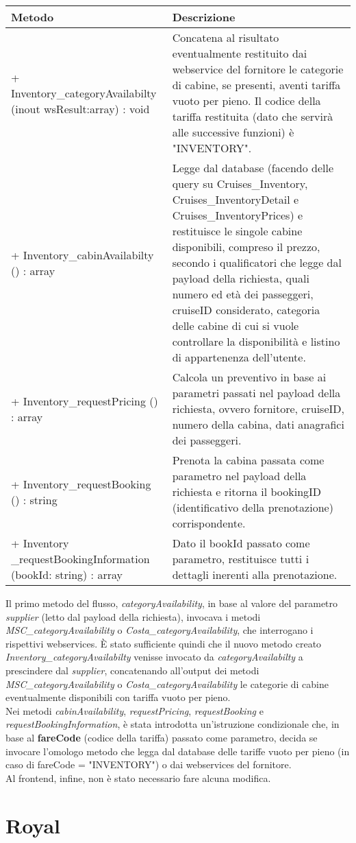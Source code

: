 \begin{center}
	\def\arraystretch{1.5}
	\begin{longtable}{ >{\raggedright}p{5.5cm} p{6.8cm}} 
		\hline
		\textbf{Metodo} & \textbf{Descrizione} \\ \hline
		+ Inventory\_categoryAvailabilty (inout wsResult:array) : void & Concatena al risultato eventualmente restituito dai \gls{webservice} del fornitore le categorie di cabine, se presenti, aventi tariffa vuoto per pieno. Il codice della tariffa restituita (dato che servirà alle successive funzioni) è "INVENTORY".\\
		\hline
		+ Inventory\_cabinAvailabilty () : array & Legge dal database (facendo delle query su Cruises\_Inventory, Cruises\_InventoryDetail e Cruises\_InventoryPrices) e restituisce le singole cabine disponibili, compreso il prezzo, secondo i qualificatori che legge dal payload della richiesta, quali numero ed età dei passeggeri, cruiseID considerato, categoria delle cabine di cui si vuole controllare la disponibilità e listino di appartenenza dell'utente.\\
		\hline
		+ Inventory\_requestPricing () : array & Calcola un preventivo in base ai parametri passati nel payload della richiesta, ovvero fornitore, cruiseID, numero della cabina, dati anagrafici dei passeggeri.\\
		\hline
		+ Inventory\_requestBooking () : string & Prenota la cabina passata come parametro nel payload della richiesta e ritorna il bookingID (identificativo della prenotazione) corrispondente.\\
		\hline
		+ Inventory \_requestBookingInformation (bookId: string) : array & Dato il bookId passato come parametro, restituisce tutti i dettagli inerenti alla prenotazione. \\
		\hline
	\end{longtable}
\end{center}
Il primo metodo del flusso, \textit{categoryAvailability}, in base al valore del parametro \textit{supplier} (letto dal payload della richiesta), invocava i metodi \textit{MSC\_categoryAvailability} o \textit{Costa\_categoryAvailability}, che interrogano i rispettivi \glspl{webservice}. È stato sufficiente quindi che il nuovo metodo creato \textit{Inventory\_categoryAvailabilty} venisse invocato da \textit{categoryAvailabilty} a prescindere dal \textit{supplier}, concatenando all'output dei metodi \textit{MSC\_categoryAvailability} o \textit{Costa\_categoryAvailability} le categorie di cabine eventualmente disponibili con tariffa vuoto per pieno.\\
Nei metodi \textit{cabinAvailability}, \textit{requestPricing}, \textit{requestBooking} e \textit{requestBookingInformation}, è stata introdotta un'istruzione condizionale che, in base al \textbf{fareCode} (codice della tariffa) passato come parametro, decida se invocare l'omologo metodo che legga dal database delle tariffe vuoto per pieno (in caso di fareCode = "INVENTORY") o dai \glspl{webservice} del fornitore.\\
Al frontend, infine, non è stato necessario fare alcuna modifica.
\newpage
\section{Royal}